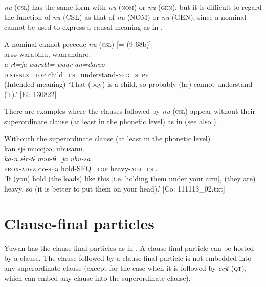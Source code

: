   \textit{nu} (\textsc{csl}) has the same form with \textit{nu} (\textsc{nom}) or \textit{nu} (\textsc{gen}), but it is difficult to regard the function of \textit{nu} (CSL) as that of \textit{nu} (NOM) or \textit{nu} (GEN), since a nominal cannot be used to express a causal meaning as in .

\ea\label{ex:10.38}   A nominal cannot precede \textit{nu} (\textsc{csl}) [= (9-68b)]\\
      \glll    *arəə  warabɨnu,  waarandaro.\\
     \textit{a-rɨ=ja}  \textit{warabɨ=}  \textit{waar-an=daroo}\\
     \textsc{dist}-\textsc{nlz}=\textsc{top}  child=\textsc{csl}  understand-\textsc{neg}=\textsc{supp}\\
    \glt     (Intended meaning) ‘That (boy) is a child, so probably (he) cannot understand (it).’ [El: 130822]
\z

  There are examples where the clauses followed by \textit{nu} (\textsc{csl}) appear without their superordinate clause (at least in the phonetic level) as in  (see also ).

\ea\label{ex:10.39}   Withouth the superordinate clause (at least in the phonetic level)\\%
      \glll    kan  sjɨ  muccjəə,  ubusanu.\\
    \textit{ka-n}  \textit{sɨr-tɨ}  \textit{mut-tɨ=ja}  \textit{ubu-sa=}\\
    \textsc{prox}-\textsc{advz}  do-\textsc{seq}  hold-SEQ=\textsc{top}  heavy-\textsc{adj}=\textsc{csl}\\
\glt     ‘If (you) hold (the loads) like this [i.e. holding them under your arm], (they are) heavy, so (it is better to put them on your head).’  [Co: 111113\_02.txt]
\z

\section{Clause-final particles}\label{sec:10.3}

Yuwan has the clause-final particles as in . A clause-final particle can be hosted by a clause. The clause followed by a clause-final particle is not embedded into any superordinate clause (except for the case when it is followed by \textit{ccjɨ} (\textsc{qt}), which can embed any clause into the superordinate clause).

